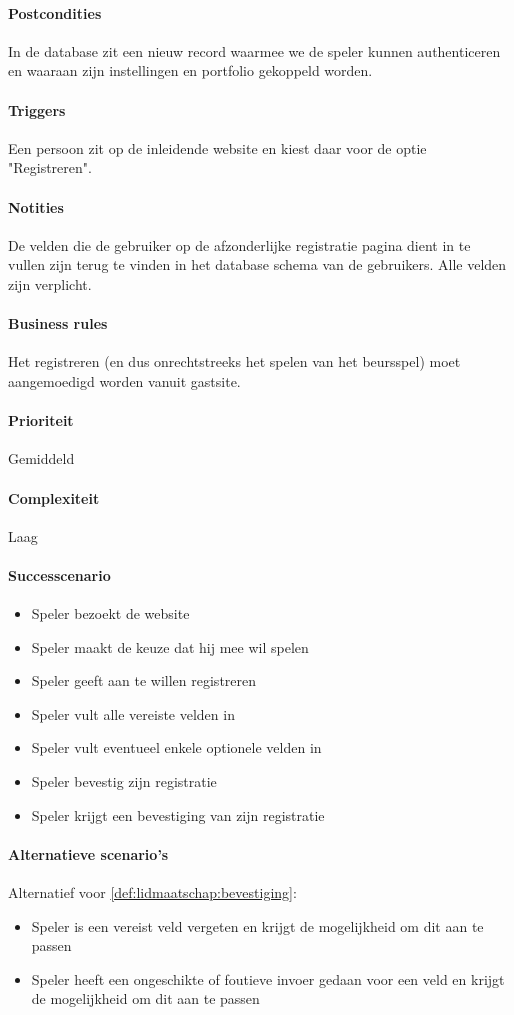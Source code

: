 \paragraph{Postcondities}In de database zit een nieuw record waarmee we de speler kunnen authenticeren en waaraan zijn instellingen en portfolio gekoppeld worden.
\paragraph{Triggers}Een persoon zit op de inleidende website en kiest daar voor de optie "Registreren".
\paragraph{Notities}De velden die de gebruiker op de afzonderlijke registratie pagina dient in te vullen zijn terug te vinden in het database schema van de gebruikers. Alle velden zijn verplicht.
\paragraph{Business rules}Het registreren (en dus onrechtstreeks het spelen van het beursspel) moet aangemoedigd worden vanuit gastsite.
\paragraph{Prioriteit}Gemiddeld
\paragraph{Complexiteit}Laag
\paragraph{Successcenario}
\begin{itemize}
 \item Speler bezoekt de website
 \item Speler maakt de keuze dat hij mee wil spelen
 \item Speler geeft aan te willen registreren
 \item Speler vult alle vereiste velden in
 \item Speler vult eventueel enkele optionele velden in
 \item Speler bevestig zijn registratie
 \item \label{def:lidmaatschap:bevestiging} Speler krijgt een bevestiging van zijn registratie
\end{itemize}
\paragraph{Alternatieve scenario’s}
Alternatief voor \ref{def:lidmaatschap:bevestiging}:
\begin{itemize}
 \item Speler is een vereist veld vergeten en krijgt de mogelijkheid om dit aan te passen
 \item Speler heeft een ongeschikte of foutieve invoer gedaan voor een veld en krijgt de mogelijkheid om dit aan te passen
\end{itemize}
 
